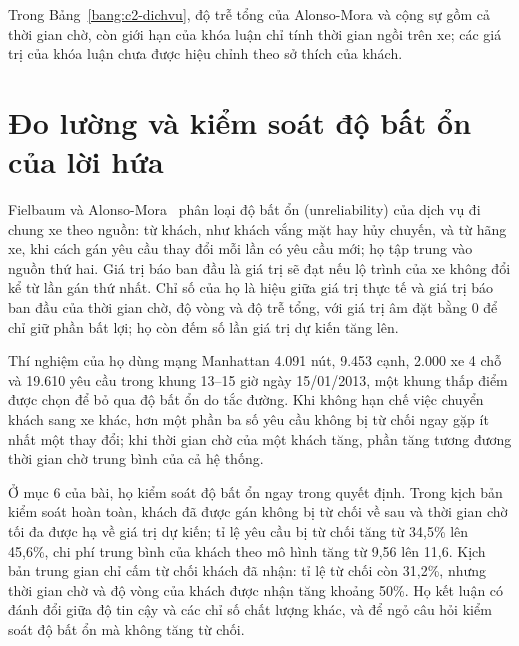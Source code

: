 Trong Bảng~\ref{bang:c2-dichvu}, độ trễ tổng của Alonso-Mora và cộng sự gồm cả thời gian chờ, còn giới hạn của khóa
luận chỉ tính thời gian ngồi trên xe; các giá trị của khóa luận chưa được hiệu chỉnh theo sở thích của khách.

\section{Đo lường và kiểm soát độ bất ổn của lời hứa}
\label{muc:c2-dolech}

Fielbaum và Alonso-Mora~\cite{fielbaum2020} phân loại độ bất ổn (unreliability) của dịch vụ đi chung xe theo nguồn:
từ khách, như khách vắng mặt hay hủy chuyến, và từ hãng xe, khi cách gán yêu cầu thay đổi mỗi lần có yêu cầu mới; họ
tập trung vào nguồn thứ hai. Giá trị báo ban đầu là giá trị sẽ đạt nếu lộ trình của xe không đổi kể từ lần gán thứ
nhất. Chỉ số của họ là hiệu giữa giá trị thực tế và giá trị báo ban đầu của thời gian chờ, độ vòng và độ trễ tổng,
với giá trị âm đặt bằng 0 để chỉ giữ phần bất lợi; họ còn đếm số lần giá trị dự kiến tăng lên.

Thí nghiệm của họ dùng mạng Manhattan 4.091 nút, 9.453 cạnh, 2.000 xe 4 chỗ và 19.610 yêu cầu trong khung 13--15 giờ
ngày 15/01/2013, một khung thấp điểm được chọn để bỏ qua độ bất ổn do tắc đường. Khi không hạn chế việc chuyển khách
sang xe khác, hơn một phần ba số yêu cầu không bị từ chối ngay gặp ít nhất một thay đổi; khi thời gian chờ của một
khách tăng, phần tăng tương đương thời gian chờ trung bình của cả hệ thống.

Ở mục 6 của bài, họ kiểm soát độ bất ổn ngay trong quyết định. Trong kịch bản kiểm soát hoàn toàn, khách đã được gán không bị
từ chối về sau và thời gian chờ tối đa được hạ về giá trị dự kiến; tỉ lệ yêu cầu bị từ chối tăng từ 34,5\% lên
45,6\%, chi phí trung bình của khách theo mô hình tăng từ 9,56 lên 11,6. Kịch bản trung gian chỉ cấm từ chối khách đã
nhận: tỉ lệ từ chối còn 31,2\%, nhưng thời gian chờ và độ vòng của khách được nhận tăng khoảng 50\%. Họ kết luận có
đánh đổi giữa độ tin cậy và các chỉ số chất lượng khác, và để ngỏ câu hỏi kiểm soát độ bất ổn mà không tăng từ chối.

